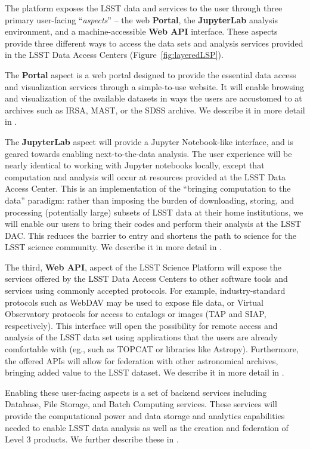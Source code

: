 \documentclass[DM,lsstdraft,toc]{lsstdoc}
\begin{document}
The platform exposes the LSST data
and services to the user through three primary user-facing ``{\it aspects}'' -- the web {\bf Portal},
the {\bf JupyterLab} analysis environment, and a machine-accessible {\bf Web API} interface. These aspects provide three different ways to access the data sets and analysis services provided in the LSST Data Access Centers (Figure~\ref{fig:layeredLSP}).

The {\bf Portal} aspect is a web portal designed to provide the essential data
access and visualization services through a simple-to-use website.  It will
enable browsing and visualization of the available datasets in ways the
users are accustomed to at archives such as IRSA, MAST, or the SDSS archive.
We describe it in more detail in .

The {\bf JupyterLab} aspect will provide a Jupyter Notebook-like interface, and 
is geared towards enabling next-to-the-data analysis. The user experience will 
be nearly identical to working with Jupyter notebooks locally, except that computation
and analysis will occur at resources provided at the LSST Data Access Center.  This is an
implementation of the “bringing computation to the data” paradigm: rather
than imposing the burden of downloading, storing, and processing (potentially large)
subsets of LSST data at their home institutions, we will enable our users to
bring their codes and perform their analysis at the LSST DAC.
This reduces the barrier to entry and shortens the path to science for
the LSST science community. We describe it in more detail in .

The third, {\bf Web API}, aspect of the LSST Science Platform will expose the
services offered by the LSST Data Access Centers to other software tools and
services using commonly accepted protocols. For example, industry-standard
protocols such as WebDAV may be used to expose file data, or Virtual Observatory
protocols for access to catalogs or images (TAP and SIAP, respectively). This interface will open the
possibility for remote access and analysis of the LSST  data set using
applications that the users are already comfortable with (eg., such as TOPCAT 
or libraries like Astropy). Furthermore, the offered APIs will allow for federation
with other astronomical archives, bringing added value to the LSST dataset.
We describe it in more detail in .

Enabling these user-facing aspects is a set of backend services including
Database, File Storage, and Batch Computing services. These services will provide
the computational power and data storage and analytics capabilities needed to
enable LSST data analysis as well as the creation and federation of Level 3 products.
We further describe these in .
\end{document}
